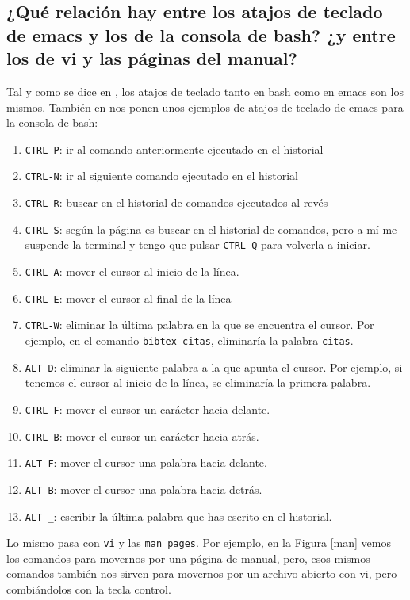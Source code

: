 \documentclass[10pt,a4paper,spanish]{article}
\numberwithin{equation}{section} %
\numberwithin{figure}{section} %
\numberwithin{table}{section} %
\begin{document}
\subsection{¿Qué relación hay entre los atajos de teclado de emacs y los de la consola de bash? ¿y entre los de vi y las páginas del manual?}
Tal y como se dice en \cite{keysemacs}, los atajos de teclado tanto en bash como en emacs son los mismos. También en \cite{keysemacs} nos ponen unos ejemplos de atajos de teclado de emacs para la consola de bash:
\begin{enumerate}[$\heartsuit$]
    \item \texttt{CTRL-P}: ir al comando anteriormente ejecutado en el historial
    \item \texttt{CTRL-N}: ir al siguiente comando ejecutado en el historial
    \item \texttt{CTRL-R}: buscar en el historial de comandos ejecutados al revés
    \item \texttt{CTRL-S}: según la página es buscar en el historial de comandos, pero a mí me suspende la terminal y tengo que pulsar \texttt{CTRL-Q} para volverla a iniciar.
    \item \texttt{CTRL-A}: mover el cursor al inicio de la línea.
    \item \texttt{CTRL-E}: mover el cursor al final de la línea
    \item \texttt{CTRL-W}: eliminar la última palabra en la que se encuentra el cursor. Por ejemplo, en el comando \texttt{bibtex citas}, eliminaría la palabra \texttt{citas}.
    \item \texttt{ALT-D}: eliminar la siguiente palabra a la que apunta el cursor. Por ejemplo, si tenemos el cursor al inicio de la línea, se eliminaría la primera palabra.
    \item \texttt{CTRL-F}: mover el cursor un carácter hacia delante.
    \item \texttt{CTRL-B}: mover el cursor un carácter hacia atrás.
    \item \texttt{ALT-F}: mover el cursor una palabra hacia delante.
    \item \texttt{ALT-B}: mover el cursor una palabra hacia detrás.
    \item \texttt{ALT-\_}: escribir la última palabra que has escrito en el historial.
\end{enumerate}

Lo mismo pasa con \texttt{vi} y las \texttt{man pages}. Por ejemplo, en la \hyperref[man]{Figura \ref*{man}} vemos los comandos para movernos por una página de manual, pero, esos mismos comandos también nos sirven para movernos por un archivo abierto con vi, pero combiándolos con la tecla control.
\end{document}
